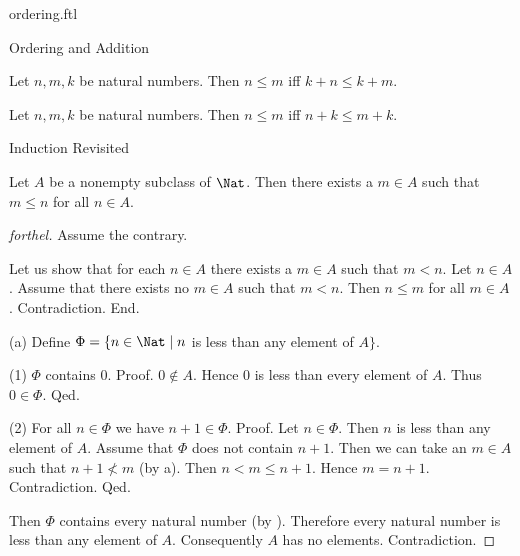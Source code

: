 \documentclass{naproche-library}
\begin{document}
\begin{smodule}[title=The Standard Ordering of the Natural Numbers]{ordering.ftl}
\begin{sfragment}{Ordering and Addition}
  \begin{corollary}[forthel,id=ARITHMETIC_04_4203390999461888]
    Let $n, m, k$ be natural numbers.
    Then $n \leq m$ iff $k + n \leq k + m$.
  \end{corollary}

  \begin{corollary}[forthel,id=ARITHMETIC_04_5512590832697344]
    Let $n, m, k$ be natural numbers.
    Then $n \leq m$ iff $n + k \leq m + k$.
  \end{corollary}
\end{sfragment}

\begin{sfragment}{Induction Revisited}
  \begin{proposition}[forthel,id=ARITHMETIC_04_272317502455808]
    Let $A$ be a nonempty subclass of $\Nat$.
    Then there exists a $m \in A$ such that $m \leq n$ for all $n \in A$.
  \end{proposition}
  \begin{proof}[forthel]
    Assume the contrary.

    Let us show that for each $n \in A$ there exists a $m \in A$ such that $m < n$.
      Let $n \in A$.
      Assume that there exists no $m \in A$ such that $m < n$.
      Then $n \leq m$ for all $m \in A$.
      Contradiction.
    End.

    (a) Define $\Phi = \{ n \in \Nat \mid n$ is less than any element of $A \}$.

    (1) $\Phi$ contains $0$. \newline
    Proof.
      $0 \notin A$.
      Hence $0$ is less than every element of $A$.
      Thus $0 \in \Phi$.
    Qed.

    (2) For all $n \in \Phi$ we have $n + 1 \in \Phi$. \newline
    Proof.
      Let $n \in \Phi$.
      Then $n$ is less than any element of $A$.
      Assume that $\Phi$ does not contain $n + 1$.
      Then we can take an $m \in A$ such that $n + 1 \nless m$ (by a).
      Then $n < m \leq n + 1$.
      Hence $m = n + 1$.
      Contradiction.
    Qed.

    Then $\Phi$ contains every natural number (by ).
    Therefore every natural number is less than any element of $A$.
    Consequently $A$ has no elements.
    Contradiction.
  \end{proof}


\end{sfragment}
\end{smodule}
\end{document}

